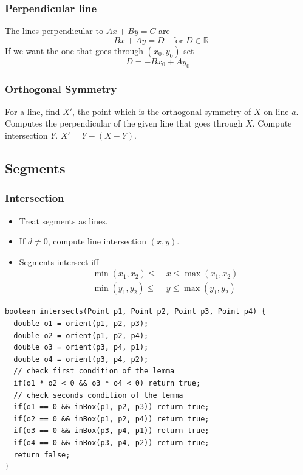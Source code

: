 \subsubsection{Perpendicular line}
The lines perpendicular to $Ax + By = C$ are
$$-Bx + Ay = D \quad \text{for $D \in \mathbb{R}$}$$
If we want the one that goes through $(x_0, y_0)$ set
$$D = - B x_0 + A y_0$$

\subsubsection{Orthogonal Symmetry}
For a line, find $X'$, the point which is the orthogonal symmetry of $X$ on line $a$. \\
Computes the perpendicular of the given line that goes through $X$. Compute intersection $Y$. $X' = Y - (X - Y)$.


\subsection{Segments}
\subsubsection{Intersection}
\begin{itemize}
\item Treat segments as lines.
\item If $d \neq 0$, compute line intersection $(x, y)$.
\item Segments intersect iff
\begin{align*}
\min(x_1, x_2) \leq & \ x \leq \max(x_1, x_2) \\
\min(y_1, y_2) \leq & \ y \leq \max(y_1, y_2)
\end{align*}
\end{itemize}
\begin{lstlisting}
boolean intersects(Point p1, Point p2, Point p3, Point p4) {
  double o1 = orient(p1, p2, p3);
  double o2 = orient(p1, p2, p4);
  double o3 = orient(p3, p4, p1);
  double o4 = orient(p3, p4, p2);
  // check first condition of the lemma
  if(o1 * o2 < 0 && o3 * o4 < 0) return true;
  // check seconds condition of the lemma
  if(o1 == 0 && inBox(p1, p2, p3)) return true;
  if(o2 == 0 && inBox(p1, p2, p4)) return true;
  if(o3 == 0 && inBox(p3, p4, p1)) return true;
  if(o4 == 0 && inBox(p3, p4, p2)) return true;
  return false;
}
\end{lstlisting}


